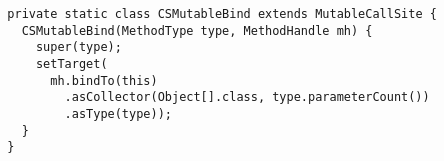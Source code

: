 {\scriptsize \begin{verbatim}
  private static class CSMutableBind extends MutableCallSite {
    CSMutableBind(MethodType type, MethodHandle mh) {
      super(type);
      setTarget(
        mh.bindTo(this)
          .asCollector(Object[].class, type.parameterCount())
          .asType(type));
    }
  }
\end{verbatim} }
